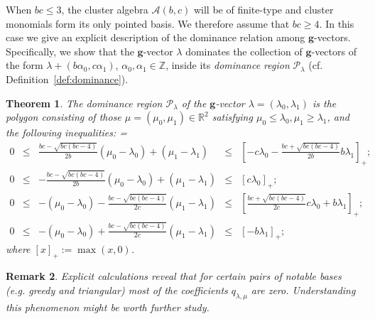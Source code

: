 \documentclass[pdflatex,sn-mathphys]{sn-jnl}%
\theoremstyle{thmstyleone}%
\newtheorem{theorem}{Theorem}[section]%
\theoremstyle{thmstyletwo}%
\newtheorem{remark}[theorem]{Remark}%
\theoremstyle{thmstylethree}%
\newcommand{\bfg}{\boldsymbol{g}}
\newcommand{\cA}{\mathcal{A}}
\newcommand{\cP}{\mathcal{P}}
\newcommand{\RR}{\mathbb{R}}
\newcommand{\ZZ}{\mathbb{Z}}
\begin{document}
  When $bc\le3$, the cluster algebra $\cA(b,c)$ will be of finite-type and cluster monomials form its only pointed basis.
  We therefore assume that $bc\ge4$.
  In this case we give an explicit description of the dominance relation among $\bfg$-vectors.
  Specifically, we show that the $\bfg$-vector $\lambda$ dominates the collection of $\bfg$-vectors of the form $\lambda+(b \alpha_0 ,c \alpha_1)$, $\alpha_0,\alpha_1\in\ZZ$, inside its \emph{dominance region} $\cP_\lambda$ (cf. Definition~\ref{def:dominance}).
  \begin{theorem}
    \label{th:dominance inequalities}
    The dominance region $\cP_\lambda$ of the $\bfg$-vector $\lambda=(\lambda_0,\lambda_1)$ is the polygon consisting of those $\mu=(\mu_0,\mu_1)\in\RR^2$ satisfying $\mu_0 \leq \lambda_0, \mu_1 \geq\lambda_1$, and the following inequalities:
    {
      \everymath={\displaystyle}
      \def\arraystretch{2.2}
      \[
        \begin{array}{rcccl}
          0 & \!\leq\! & \frac{b c-\sqrt{b c (b c-4)}}{2 b}(\mu_0-\lambda_0)+(\mu_1-\lambda_1) & \!\leq\! & \left[-c\lambda_0-\frac{b c+\sqrt{b c (b c-4)}}{2b}b\lambda_1\right]_+\!\!;
          \\
          0 & \!\leq\! & -\frac{b c-\sqrt{b c (b c-4)}}{2 b}(\mu_0-\lambda_0)+(\mu_1-\lambda_1) & \!\leq\! & \left[c\lambda_0\right]_+;
          \\
          0 & \!\leq\! &  -(\mu_0-\lambda_0)-\frac{b c-\sqrt{b c (b c-4)}}{2 c}(\mu_1-\lambda_1) & \!\leq\! & \left[\frac{b c+\sqrt{b c (b c-4)}}{2c}c\lambda_0+b\lambda_1\right]_+\!\!;
          \\
          0 & \!\leq\! & -(\mu_0-\lambda_0) + \frac{b c-\sqrt{b c (b c-4)}}{2 c} (\mu_1-\lambda_1) & \!\leq\! & \left[-b \lambda_1\right]_+;
        \end{array}
      \]
    }
    where $[x]_+:=\max(x,0)$.
    
  \vspace{-1.05em}
  \end{theorem}
  \begin{remark}
    Explicit calculations reveal that for certain pairs of notable bases (e.g. greedy and triangular) most of the coefficients $q_{\lambda,\mu}$ are zero.
    Understanding this phenomenon might be worth further study.
  \end{remark}
\end{document}
